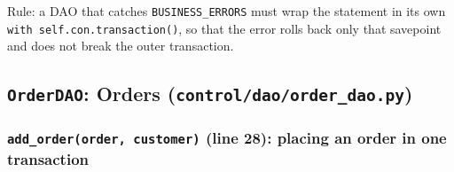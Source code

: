 Rule: a DAO that catches \texttt{BUSINESS\_\allowbreak{}ERRORS} must wrap the
statement in its own \texttt{with self.\allowbreak{}con.\allowbreak{}transaction(\allowbreak{})}, so that the
error rolls back only that savepoint and does not break the outer
transaction.

\hypertarget{orderdao-orders-controldaoorder_dao.py}{%
\subsection{\texorpdfstring{\texttt{OrderDAO}: Orders
(\texttt{control/\allowbreak{}dao/\allowbreak{}order\_\allowbreak{}dao.\allowbreak{}py})}{OrderDAO: Orders (control/dao/order\_dao.py)}}\label{orderdao-orders-controldaoorder_dao.py}}

\hypertarget{add_orderorder-customer-line-28-placing-an-order-in-one-transaction}{%
\subsubsection{\texorpdfstring{\texttt{add\_\allowbreak{}order(\allowbreak{}order,\allowbreak{} customer)}
(line 28): placing an order in \textbf{one
transaction}}{add\_order(order, customer) (line 28): placing an order in one transaction}}\label{add_orderorder-customer-line-28-placing-an-order-in-one-transaction}}

